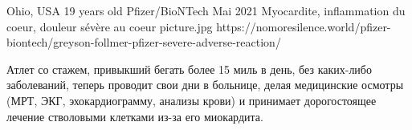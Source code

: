           {Ohio, USA}
          {19 years old}
          {Pfizer/BioNTech}
          {Mai 2021}
          {Myocardite, inflammation du coeur, douleur sévère au coeur
          }
          {picture.jpg}
          {https://nomoresilence.world/pfizer-biontech/greyson-follmer-pfizer-severe-adverse-reaction/}
          {


Атлет со стажем, привыкший бегать более 15 миль в день, без каких-либо
заболеваний, теперь проводит свои дни в больнице, делая медицинские осмотры
(МРТ, ЭКГ, эхокардиограмму, анализы крови) и принимает дорогостоящее лечение
стволовыми клетками из-за его миокардита.

}

